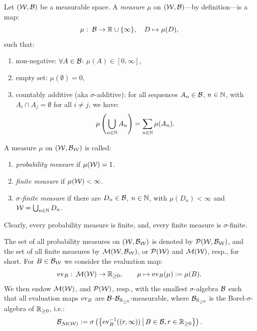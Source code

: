 \begin{Def}[Measures]
    \label{def:measure}
    Let $(\mathcal{W},\mathcal{B})$ be a measurable space.
    A \emph{measure} $\mu$ on $(\mathcal{W},\mathcal{B})$---by definition---is a map:
    \[\mu: \; \mathcal{B} \to \mathbb{R} \cup \{\infty\},\quad D \mapsto \mu(D), \]
    such that:
    \begin{enumerate}[label=\roman*)]
        \item non-negative: $\forall A \in \mathcal{B}$: $\mu(A) \in [0,\infty]$,
        \item empty set: $\mu(\emptyset) =0$,
        \item countably additive (aka $\sigma$-additive): for all sequences $A_n \in \mathcal{B}$, $n \in \mathbb{N}$, with $A_i \cap A_j = \emptyset$ for all $i \neq j$, we have:
    \[\mu\left (\bigcup_{n \in \mathbb{N}} A_n\right ) = \sum_{n \in \mathbb{N}} \mu(A_n).\]
    \end{enumerate}
\end{Def}

\begin{Def}
    A measure $\mu$ on $(\mathcal{W},\mathcal{B}_{\mathcal{W}})$ is called:
    \begin{enumerate}
        \item \emph{probability measure} if $\mu(\mathcal{W})=1$.
        \item \emph{finite measure} if $\mu(\mathcal{W}) < \infty$.
        \item \emph{$\sigma$-finite measure} if there are $D_n \in \mathcal{B}$, $n \in \mathbb{N}$, with $\mu(D_n) < \infty$ and $\mathcal{W} = \bigcup_{n \in \mathbb{N}} D_n$.
    \end{enumerate}
\end{Def}

Clearly, every probability measure is finite, and, every finite measure is $\sigma$-finite.

\begin{Def}\label{spaces_of_finite_and_prob_measures}
   The set of all probability measures on $(\mathcal{W},\mathcal{B}_{\mathcal{W}})$ is denoted by $\mathcal{P}(\mathcal{W},\mathcal{B}_{\mathcal{W}})$,
   and the set of all finite measures by $\mathcal{M}(\mathcal{W},\mathcal{B}_{\mathcal{W}})$, or $\mathcal{P}(\mathcal{W})$ and $\mathcal{M}(\mathcal{W})$, resp., for short.
    For $B \in \mathcal{B}_{\mathcal{W}}$ we consider 
    the evaluation map:
    \[ \mathrm{ev}_B:\, \mathcal{M}(\mathcal{W}) \to \mathbb{R}_{\ge0},\qquad \mu \mapsto \mathrm{ev}_B(\mu):=\mu(B).
    \]
    We then endow $\mathcal{M}(\mathcal{W})$, and $\mathcal{P}(\mathcal{W})$, resp., with the smallest $\sigma$-algebra $\mathcal{B}$
    such that all evaluation maps $\mathrm{ev}_B$ are $\mathcal{B}$-$\mathcal{B}_{\mathbb{R}_{\ge0}}$-measurable, where $\mathcal{B}_{\mathbb{R}_{\ge0}}$
    is the Borel-$\sigma$-algebra of $\mathbb{R}_{\ge 0}$, i.e.:
    \[ \mathcal{B}_{\mathcal{M}(\mathcal{W})}:=\sigma\left (\left \{ \mathrm{ev}_B^{-1}((r,\infty)) \,\middle|\, B \in \mathcal{B}, r \in \mathbb{R}_{\ge 0} \right \}\right ).  \]
\end{Def}

